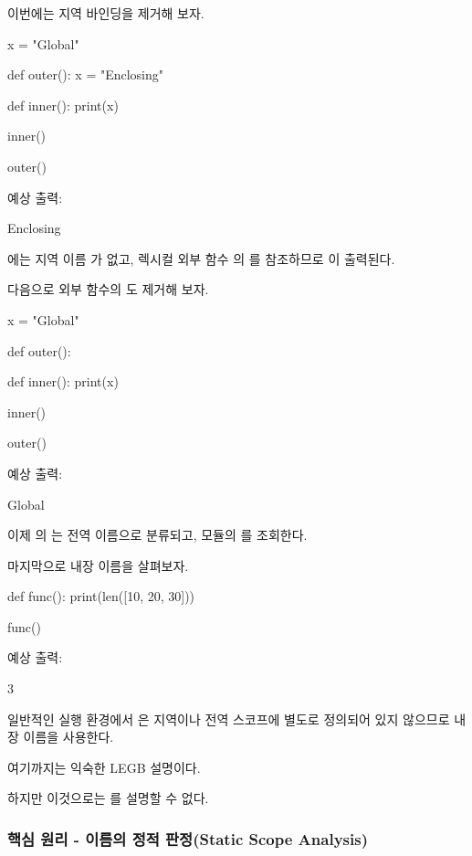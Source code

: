 이번에는 지역 바인딩을 제거해 보자.

\begin{dhkcode}
x = "Global"

def outer():
    x = "Enclosing"

    def inner():
        print(x)

    inner()

outer()
\end{dhkcode}

예상 출력:

\begin{dhkzsh}
Enclosing
\end{dhkzsh}

에는 지역 이름 가 없고, 렉시컬 외부 함수 의 를 참조하므로 이 출력된다.

다음으로 외부 함수의 도 제거해 보자.

\begin{dhkcode}
x = "Global"

def outer():

    def inner():
        print(x)

    inner()

outer()
\end{dhkcode}

예상 출력:

\begin{dhkzsh}
Global
\end{dhkzsh}

이제 의 는 전역 이름으로 분류되고, 모듈의 를 조회한다.

마지막으로 내장 이름을 살펴보자.

\begin{dhkcode}
def func():
    print(len([10, 20, 30]))

func()
\end{dhkcode}

예상 출력:

\begin{dhkzsh}
3
\end{dhkzsh}

일반적인 실행 환경에서 은 지역이나 전역 스코프에 별도로 정의되어 있지 않으므로 내장 이름을 사용한다.

여기까지는 익숙한 LEGB 설명이다.

하지만 이것으로는 를 설명할 수 없다.

\subsubsection{핵심 원리 - 이름의 정적 판정(Static Scope Analysis)}

